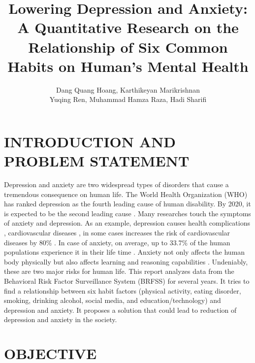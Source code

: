 \documentclass[letterpaper, 10 pt, conference]{ieeeconf}  %
\title{\LARGE \bf
Lowering Depression and Anxiety: A Quantitative Research on the Relationship of Six Common Habits 
on Human's Mental Health
}
\author{Dang Quang Hoang, Karthikeyan Marikrishnan \\ Yuqing Ren, Muhammad Hamza Raza, Hadi Sharifi}
\begin{document}
\maketitle
\thispagestyle{empty}
\pagestyle{empty}






\section{INTRODUCTION AND PROBLEM STATEMENT}
Depression and anxiety are two widespread types of disorders that cause a tremendous consequence on human life.  
The World Health Organization (WHO) has ranked depression as the fourth leading cause of human disability.
By 2020, it is expected to be the second leading cause \cite{kessler2013epidemiology}. Many researches touch the symptoms of anxiety and depression.
As an example, depression causes health 
complications \cite{verma2017impact}, cardiovascular diseases \cite{bradley2015depression}, in some cases increases 
the risk of cardiovascular diseases by 80\% \cite{penninx2017depression}. In case of anxiety, on average, up to 33.7\% of 
the human populations experience it in their life time \cite{bandelow2015epidemiology}. Anxiety not only affects the human body physically
but also affects learning and reasoning capabilities \cite{spielberger2013effects}\cite{darke1988effects}. 
Undeniably, these are two major risks for human life.
This report analyzes data from the Behavioral Risk Factor Surveillance System (BRFSS)\cite{brfss} for several years. 
It tries to find a relationship between six habit factors (physical activity, eating disorder, 
smoking, drinking alcohol, social media, and education/technology) and depression and anxiety. It proposes a
solution that could lead to reduction of depression and anxiety in the society. 

\section{OBJECTIVE}
\end{document}

